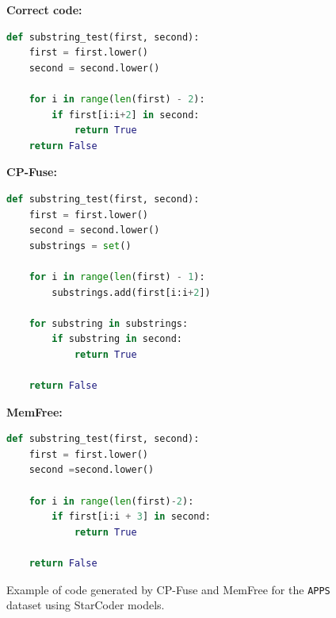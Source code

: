 \begin{figure}[!htbp]
    \centering
    \begin{promptmdfmem}
        \textbf{Correct code:}
    \begin{lstlisting}[style=mystyle, language=Python]
def substring_test(first, second):
    first = first.lower()
    second = second.lower()

    for i in range(len(first) - 2):
        if first[i:i+2] in second:
            return True
    return False
        \end{lstlisting}
        \textbf{CP-Fuse:}
        \begin{lstlisting}[style=mystyle, language=Python]
def substring_test(first, second):
    first = first.lower()
    second = second.lower()
    substrings = set()
    
    for i in range(len(first) - 1):
        substrings.add(first[i:i+2])
    
    for substring in substrings:
        if substring in second:
            return True
    
    return False
        \end{lstlisting}
        \textbf{MemFree:}
        \begin{lstlisting}[style=mystyle, language=Python]
def substring_test(first, second): 
    first = first.lower()
    second =second.lower()
    
    for i in range(len(first)-2):
        if first[i:i + 3] in second:
            return True
        
    return False
        \end{lstlisting}
    \end{promptmdfmem}
    \caption{Example of code generated by CP-Fuse and MemFree for the \texttt{APPS} dataset using StarCoder models.}    \label{fig:example1_code_memfree}
\end{figure}




